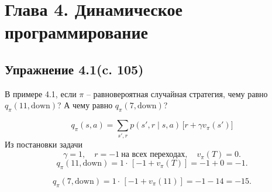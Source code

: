 \section{Глава 4. Динамическое программирование}
\subsection{Упражнение 4.1(c. 105)}
В примере 4.1, если $\pi$ – равновероятная случайная стратегия, чему равно $q_{\pi}(11, \text{down})$? А чему равно $q_{\pi}(7, \text{down})$?
\begin{solution}
    \[
    q_{\pi}(s,a)=\sum_{s',r} p(s',r\mid s,a)\,\bigl[r+\gamma v_{\pi}(s')\bigr]
    \]
    Из постановки задачи 
    \[\gamma=1,\quad r=-1\ \text{на всех переходах},\quad v_{\pi}(T)=0.\]
    \[
    q_{\pi}(11,\text{down})
    =1\cdot\,[-1+v_{\pi}(T)]=-1 + 0 = -1.
    \]
    
    \[
    q_{\pi}(7,\text{down})
    =1\cdot\,[-1+v_{\pi}(11)]
    =-1-14=-15.
    \]
\end{solution}

